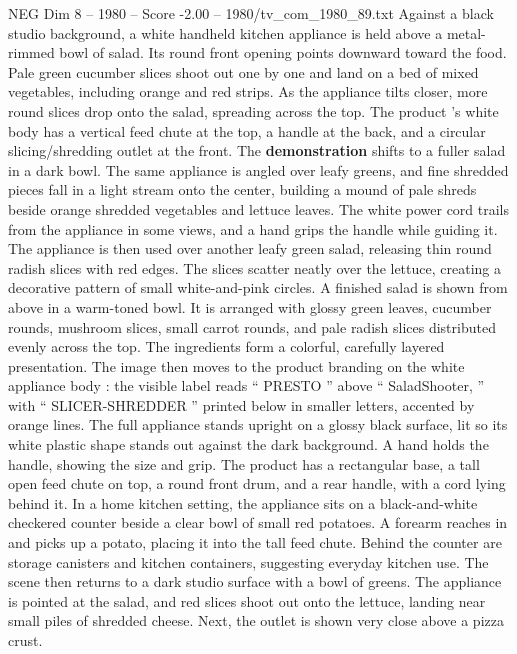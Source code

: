 \begin{textsample}{NEG Dim 8 – 1980 – Score -2.00 – 1980/tv\_com\_1980\_89.txt}  \label{ex:f8_neg_059}
Against a black studio background, a white handheld kitchen appliance is held above a metal-rimmed bowl of salad.
Its round front opening points downward toward the food.
Pale green cucumber slices shoot out one by one and land on a bed of mixed vegetables, including orange and red strips.
As the appliance tilts closer, more round slices drop onto the salad, spreading across the top.
The product ’s white body has a vertical feed chute at the top, a handle at the back, and a circular slicing/shredding outlet at the front.
The \textbf{demonstration} shifts to a fuller salad in a dark bowl.
The same appliance is angled over leafy greens, and fine shredded pieces fall in a light stream onto the center, building a mound of pale shreds beside orange shredded vegetables and lettuce leaves.
The white power cord trails from the appliance in some views, and a hand grips the handle while guiding it.
The appliance is then used over another leafy green salad, releasing thin round radish slices with red edges.
The slices scatter neatly over the lettuce, creating a decorative pattern of small white-and-pink circles.
A finished salad is shown from above in a warm-toned bowl.
It is arranged with glossy green leaves, cucumber rounds, mushroom slices, small carrot rounds, and pale radish slices distributed evenly across the top.
The ingredients form a colorful, carefully layered presentation.
The image then moves to the product branding on the white appliance body : the visible label reads “ PRESTO ” above “ SaladShooter, ” with “ SLICER-SHREDDER ” printed below in smaller letters, accented by orange lines.
The full appliance stands upright on a glossy black surface, lit so its white plastic shape stands out against the dark background.
A hand holds the handle, showing the size and grip.
The product has a rectangular base, a tall open feed chute on top, a round front drum, and a rear handle, with a cord lying behind it.
In a home kitchen setting, the appliance sits on a black-and-white checkered counter beside a clear bowl of small red potatoes.
A forearm reaches in and picks up a potato, placing it into the tall feed chute.
Behind the counter are storage canisters and kitchen containers, suggesting everyday kitchen use.
The scene then returns to a dark studio surface with a bowl of greens.
The appliance is pointed at the salad, and red slices shoot out onto the lettuce, landing near small piles of shredded cheese.
Next, the outlet is shown very close above a pizza crust.

\end{textsample}
